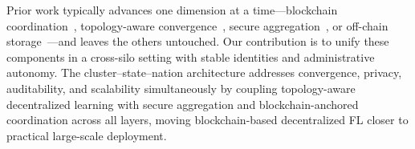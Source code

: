 Prior work typically advances one dimension at a time—blockchain coordination~\cite{BCFramework}, topology-aware convergence~\cite{Dclique,Refined}, secure aggregation~\cite{SecureAggregation}, or off-chain storage~\cite{BCIOT}—and leaves the others untouched. Our contribution is to unify these components in a cross-silo setting with stable identities and administrative autonomy. The cluster–state–nation architecture addresses convergence, privacy, auditability, and scalability simultaneously by coupling topology-aware decentralized learning with secure aggregation and blockchain-anchored coordination across all layers, moving blockchain-based decentralized FL closer to practical large-scale deployment.
